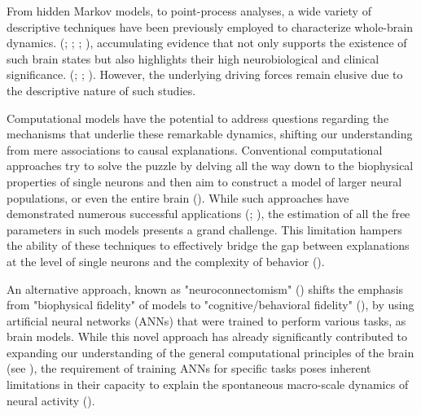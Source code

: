 \documentclass{article}
\begin{document}
From hidden Markov models, to point-process analyses, a wide variety of descriptive techniques have been previously employed to characterize whole-brain dynamics. (\href{https://doi.org/10.1073/pnas.1121329109}{}; \href{https://doi.org/10.1073/pnas.1705120114}{}; \href{https://doi.org/10.1073/pnas.1216856110}{}; \href{https://doi.org/10.1089/brain.2018.0586}{}), accumulating evidence that not only supports the existence of such brain states but also highlights their high neurobiological and clinical significance. (\href{https://doi.org/10.1016/j.neuroimage.2013.05.079}{}; \href{https://doi.org/10.1073/pnas.1418031112}{}; \href{https://doi.org/10.1038/s41467-020-18717-w}{}).
However, the underlying driving forces remain elusive due to the descriptive nature of such studies.


Computational models have the potential to address questions regarding the mechanisms that underlie these remarkable dynamics, shifting our understanding from mere associations to causal explanations.
Conventional computational approaches try to solve the puzzle by delving all the way down to the biophysical properties of single neurons and then aim to construct a model of larger neural populations, or even the entire brain (\href{https://doi.org/10.1038/nn.4497}{}).
While such approaches have demonstrated numerous successful applications (\href{https://doi.org/10.1038/s41593-018-0210-5}{}; \href{https://doi.org/10.1093/schbul/sby154}{}), the estimation of all the free parameters in such models presents a grand challenge. This limitation hampers the ability of these techniques to effectively bridge the gap between explanations at the level of single neurons and the complexity of behavior (\href{https://doi.org/10.1038/nn.4497}{}).

An alternative approach, known as "neuroconnectomism" (\href{https://doi.org/10.1038/s41583-023-00705-w}{}) shifts the emphasis from "biophysical fidelity" of models to "cognitive/behavioral fidelity" (\href{https://doi.org/10.1038/s41593-018-0210-5}{}), by using artificial neural networks (ANNs) that were trained to perform various tasks, as brain models.
While this novel approach has already significantly contributed to expanding our understanding of the general computational principles of the brain (see \href{https://doi.org/10.1038/s41583-023-00705-w}{}), the requirement of training ANNs for specific tasks poses inherent limitations in their capacity to explain the spontaneous macro-scale dynamics of neural activity (\href{https://doi.org/10.1038/s41593-019-0520-2}{}).
\end{document}
